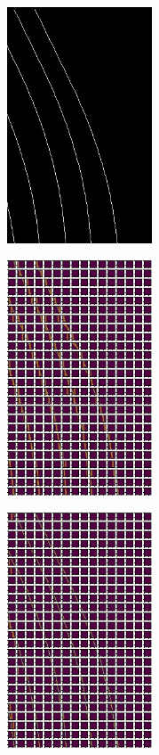 \begin{figure}[h]
      \caption{(a) Binary lane segmentation mask (b) Detected lanes via Hough Transform (c) Detected lanes via Hough Transform and using Hesse normal form as a post-processing step }
        \centering
        \begin{subfigure}{0.4\textwidth}
        \includegraphics[width=1\linewidth, height=7cm]{images/test_bev_lanes.jpeg} 
        \caption{}
        \label{fig:subim1}
        \end{subfigure}
        \begin{subfigure}{0.4\textwidth}
        \includegraphics[width=1\linewidth,height=7cm]{images/detected_lines_r.jpg}
        \caption{}
        \label{fig:subim2}
        \end{subfigure}
        \begin{subfigure}{0.4\textwidth}
        \includegraphics[width=1\linewidth,height=7cm]{images/detected_lines_rprime.jpg}
        \caption{}
        \label{fig:subim2}
        \end{subfigure}
        \end{figure}
        
